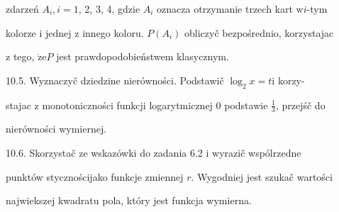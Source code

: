 \documentclass[a4paper,12pt]{article}
\begin{document}
zdarzeń $A_{i}, i=1$, 2, 3, 4, gdzie $A_{i}$ oznacza otrzymanie trzech kart $\mathrm{w}i$-tym

kolorze $\mathrm{i}$ jednej $\mathrm{z}$ innego koloru. $P(A_{i})$ obliczyč bezpośrednio, korzystajac

$\mathrm{z}$ tego, $\dot{\mathrm{z}}\mathrm{e}P$ jest prawdopodobieństwem klasycznym.

10.5. Wyznaczyč dziedzine nierówności. Podstawič $\log_{2}x=t \mathrm{i}$ korzy-

stajac $\mathrm{z}$ monotoniczności funkcji logarytmicznej $0$ podstawie $\displaystyle \frac{1}{3}$, przejśč do

nierówności wymiernej.

10.6. Skorzystač ze wskazówki do zadania 6.2 $\mathrm{i}$ wyrazič wspólrzedne

punktów stycznościjako funkcje zmiennej $r$. Wygodniej jest szukač wartości

najwiekszej kwadratu pola, który jest funkcja wymierna.
\end{document}
